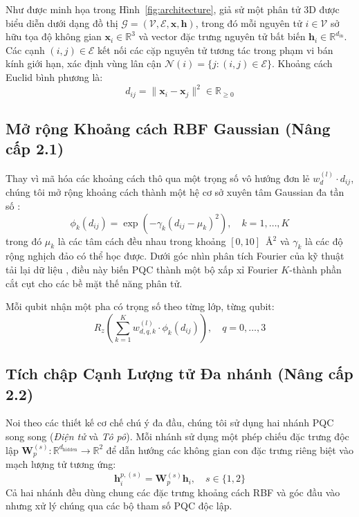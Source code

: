 \documentclass[10pt,twocolumn,letterpaper]{article}
\begin{document}
Như được minh họa trong Hình~\ref{fig:architecture}, giả sử một phân tử 3D được biểu diễn dưới dạng đồ thị $\mathcal{G} = (\mathcal{V}, \mathcal{E}, \mathbf{x}, \mathbf{h})$, trong đó mỗi nguyên tử $i \in \mathcal{V}$ sở hữu tọa độ không gian $\mathbf{x}_i \in \mathbb{R}^3$ và vector đặc trưng nguyên tử bất biến $\mathbf{h}_i \in \mathbb{R}^{d_{\mathrm{in}}}$. Các cạnh $(i, j) \in \mathcal{E}$ kết nối các cặp nguyên tử tương tác trong phạm vi bán kính giới hạn, xác định vùng lân cận $\mathcal{N}(i) = \{j : (i, j) \in \mathcal{E}\}$. Khoảng cách Euclid bình phương là:
\begin{equation}
    d_{ij} = \|\mathbf{x}_i - \mathbf{x}_j\|^2 \in \mathbb{R}_{\ge 0}
\end{equation}

\subsection{Mở rộng Khoảng cách RBF Gaussian (Nâng cấp 2.1)}

Thay vì mã hóa các khoảng cách thô qua một trọng số vô hướng đơn lẻ $w_d^{(l)} \cdot d_{ij}$, chúng tôi mở rộng khoảng cách thành một hệ cơ sở xuyên tâm Gaussian đa tần số \cite{schütt2017schnetcontinuousfilterconvolutionalneural}:
\begin{equation}
    \phi_k(d_{ij}) = \exp\left(-\gamma_k (d_{ij} - \mu_k)^2\right), \quad k = 1, \ldots, K
    \label{eq:rbf}
\end{equation}
trong đó $\mu_k$ là các tâm cách đều nhau trong khoảng $[0, 10]$~\AA$^2$ và $\gamma_k$ là các độ rộng nghịch đảo có thể học được. Dưới góc nhìn phân tích Fourier của kỹ thuật tải lại dữ liệu \cite{Perez-Salinas:2019pjx, Schuld:2020enb}, điều này biến PQC thành một bộ xấp xỉ Fourier $K$-thành phần cắt cụt cho các bề mặt thế năng phân tử.

Mỗi qubit nhận một pha có trọng số theo từng lớp, từng qubit:
\begin{equation}
    R_z\!\left(\sum_{k=1}^K w_{d,q,k}^{(l)} \cdot \phi_k(d_{ij})\right), \quad q = 0, \ldots, 3
\end{equation}

\subsection{Tích chập Cạnh Lượng tử Đa nhánh (Nâng cấp 2.2)}

Noi theo các thiết kế cơ chế chú ý đa đầu, chúng tôi sử dụng hai nhánh PQC song song (\textit{Điện tử} và \textit{Tô pô}). Mỗi nhánh sử dụng một phép chiếu đặc trưng độc lập $\mathbf{W}_p^{(s)}: \mathbb{R}^{d_{\mathrm{hidden}}} \to \mathbb{R}^2$ để dẫn hướng các không gian con đặc trưng riêng biệt vào mạch lượng tử tương ứng:
\begin{equation}
    \mathbf{h}_i^{p,(s)} = \mathbf{W}_p^{(s)} \mathbf{h}_i, \quad s \in \{1, 2\}
\end{equation}
Cả hai nhánh đều dùng chung các đặc trưng khoảng cách RBF và góc đầu vào nhưng xử lý chúng qua các bộ tham số PQC độc lập.
\end{document}
